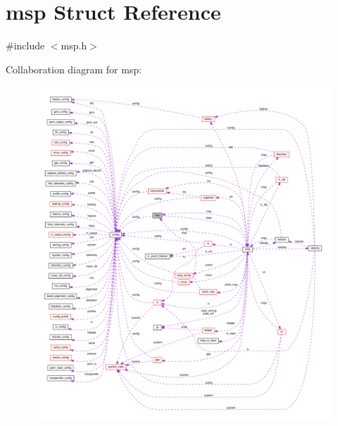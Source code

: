 \hypertarget{structmsp}{\section{msp Struct Reference}
\label{structmsp}
}


{\ttfamily \#include $<$msp.\+h$>$}



Collaboration diagram for msp\+:
\nopagebreak
\begin{figure}[H]
\begin{center}
\leavevmode
\includegraphics[width=350pt]{structmsp__coll__graph}
\end{center}
\end{figure}
